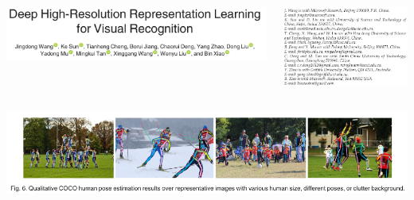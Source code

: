\begin{frame}
   \centering
   \begin{columns}
      \begin{column}{0.65\linewidth}
         \includegraphics[width=\columnwidth]{images/hrnet-title.png}
      \end{column}
      \begin{column}{0.35\linewidth}
         \includegraphics[width=\columnwidth]{images/hrnet-authors.png}
      \end{column}
   \end{columns}
   \vfill
   \includegraphics[width=\linewidth]{images/hrnet-human-pose.png}
\end{frame}


